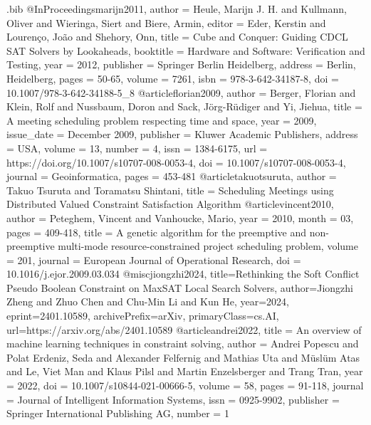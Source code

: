 \begin{filecontents}{\jobname.bib}
    @InProceedings{marijn2011,
        author = {Heule, Marijn J. H. and Kullmann, Oliver and Wieringa, Siert and Biere, Armin},
        editor = {Eder, Kerstin and Louren{\c{c}}o, Jo{\~a}o and Shehory, Onn},
        title = {Cube and Conquer: Guiding CDCL SAT Solvers by Lookaheads},
        booktitle = {Hardware and Software: Verification and Testing},
        year = {2012},
        publisher = {Springer Berlin Heidelberg},
        address = {Berlin, Heidelberg},
        pages = {50-65},
        volume = {7261},
        isbn = {978-3-642-34187-8},
        doi = {10.1007/978-3-642-34188-5_8}
    }
    @article{florian2009,
        author = {Berger, Florian and Klein, Rolf and Nussbaum, Doron and Sack, J\"{o}rg-R\"{u}diger and Yi, Jiehua},
        title = {A meeting scheduling problem respecting time and space},
        year = {2009},
        issue_date = {December  2009},
        publisher = {Kluwer Academic Publishers},
        address = {USA},
        volume = {13},
        number = {4},
        issn = {1384-6175},
        url = {https://doi.org/10.1007/s10707-008-0053-4},
        doi = {10.1007/s10707-008-0053-4},
        journal = {Geoinformatica},
        pages = {453-481}
    }
    @article{takuotsuruta,
        author = {Takuo Tsuruta and Toramatsu Shintani},
        title = {Scheduling Meetings using Distributed Valued Constraint Satisfaction Algorithm}
    }
    @article{vincent2010,
        author = {Peteghem, Vincent and Vanhoucke, Mario},
        year = {2010},
        month = {03},
        pages = {409-418},
        title = {A genetic algorithm for the preemptive and non-preemptive multi-mode resource-constrained project scheduling problem},
        volume = {201},
        journal = {European Journal of Operational Research},
        doi = {10.1016/j.ejor.2009.03.034}
    }
    @misc{jiongzhi2024,
        title={Rethinking the Soft Conflict Pseudo Boolean Constraint on MaxSAT Local Search Solvers}, 
        author={Jiongzhi Zheng and Zhuo Chen and Chu-Min Li and Kun He},
        year={2024},
        eprint={2401.10589},
        archivePrefix={arXiv},
        primaryClass={cs.AI},
        url={https://arxiv.org/abs/2401.10589}
    }
    @article{andrei2022,
        title = {An overview of machine learning techniques in constraint solving},
        author = {Andrei Popescu and {Polat Erdeniz}, Seda and Alexander Felfernig and Mathias Uta and M{\"u}sl{\"u}m Atas and Le, {Viet Man} and Klaus Pilsl and Martin Enzelsberger and Trang Tran},
        year = {2022},
        doi = {10.1007/s10844-021-00666-5},
        volume = {58},
        pages = {91-118},
        journal = {Journal of Intelligent Information Systems},
        issn = {0925-9902},
        publisher = {Springer International Publishing AG},
        number = {1}
    }

    
\end{filecontents}
